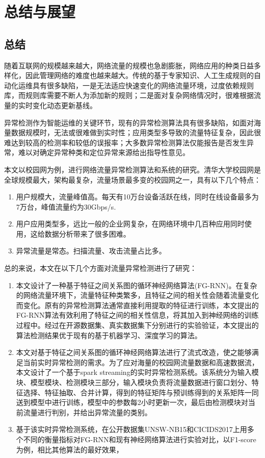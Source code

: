 \chapter{总结与展望}
\section{总结}
随着互联网的规模越来越大，网络流量的规模也急剧膨胀，网络应用的种类日益多样化，因此管理网络的难度也越来越大。传统的基于专家知识、人工生成规则的自动化运维具有很多缺陷，一是无法适应快速变化的网络流量环境，过度依赖规则库，而规则库需要不断人为添加新的规则；二是面对复杂网络情况时，很难根据流量的实时变化动态更新基线。

异常检测作为智能运维的关键环节，现有的异常检测算法具有很多缺陷，如面对海量数据规模时，无法或很难做到实时性；应用类型多导致的流量特征复杂，因此很难达到较高的检测率和较低的误报率；大多数异常检测算法仅能报告是否发生异常，难以对确定异常种类和定位异常来源给出指导性意见。

本文以校园网为例，进行网络流量异常检测算法和系统的研究。清华大学校园网是全球规模最大，架构最复杂，流量场景最多变的校园网之一，具有以下几个特点：
\begin{enumerate}
    \item 用户规模大，流量峰值高。每天有10万台设备活跃在线，同时在线设备最多为7万台，峰值流量约为30Gbps/s.
    \item	用户应用类型多，远比一般的企业网复杂，在网络环境中几百种应用同时使用，这给数据分析带来了很多困难。
    \item	异常流量是常态。扫描流量、攻击流量占比多。
\end{enumerate}

总的来说，本文在以下几个方面对流量异常检测进行了研究：
\begin{enumerate}
    \item 本文设计了一种基于特征之间关系图的循环神经网络算法(FG-RNN)。在复杂的网络流量环境下，流量特征种类繁多，且特征之间的相关性会随着流量变化而变化。原有的异常检测算法通常直接利用提取的特征进行训练，本文提出的FG-RNN算法有效利用了特征之间的相关性信息，将其加入到神经网络的训练过程中。经过在开源数据集、真实数据集下分别进行的实验验证，本文提出的算法检测结果优于现有的基于机器学习、深度学习的算法。
    \item 本文对基于特征之间关系图的循环神经网络算法进行了流式改造，使之能够满足当前实时异常检测的需求。为了应对海量的校园网流量数据和高速数据流，本文设计了一个基于spark streaming的实时异常检测系统。该系统分为输入模块、模型模块、检测模块三部分，输入模块负责将流量数据进行窗口划分、特征选择、特征抽取、合并计算，得到的特征矩阵与预训练得到的关系矩阵一同送到模型中进行训练，模型中的参数每2小时更新一次，最后由检测模块对当前流量进行判别，并给出异常流量的类别。
    \item 基于该实时异常检测系统，在公开数据集UNSW-NB15和CICIDS2017上用多个不同的衡量指标对FG-RNN和现有神经网络算法进行实验对比，以F1-score为例，相比其他算法的最好效果，
\end{enumerate}

